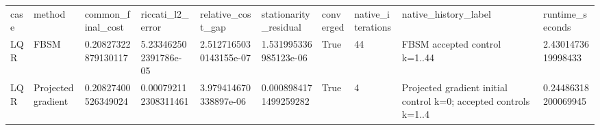 \begin{tabular}{llllllllll}
case & method & common\_final\_cost & riccati\_l2\_error & relative\_cost\_gap & stationarity\_residual & converged & native\_iterations & native\_history\_label & runtime\_seconds \\
LQR & FBSM & 0.20827322879130117 & 5.233462502391786e-05 & 2.5127165030143155e-07 & 1.531995336985123e-06 & True & 44 & FBSM accepted control k=1..44 & 2.4301473619998433 \\
LQR & Projected gradient & 0.20827400526349024 & 0.000792112308311461 & 3.979414670338897e-06 & 0.0008984171499259282 & True & 4 & Projected gradient initial control k=0; accepted controls k=1..4 & 0.24486318200069945 \\
\end{tabular}
